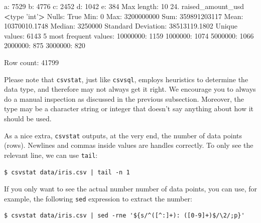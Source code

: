 \documentclass[
]{book}
\newenvironment{Shaded}{\begin{snugshade}}{\end{snugshade}}
\newcommand{\BuiltInTok}[1]{#1}
\newcommand{\ExtensionTok}[1]{#1}
\newcommand{\NormalTok}[1]{#1}
\newcommand{\OperatorTok}[1]{\textcolor[rgb]{0.81,0.36,0.00}{\textbf{#1}}}
\newcommand{\StringTok}[1]{\textcolor[rgb]{0.31,0.60,0.02}{#1}}
\theoremstyle{definition}
\theoremstyle{definition}
\theoremstyle{definition}
\theoremstyle{remark}
\begin{document}
\begin{Shaded}
\begin{Highlighting}[]
                \ExtensionTok{a}\NormalTok{:      7529}
                \ExtensionTok{b}\NormalTok{:      4776}
                \ExtensionTok{c}\NormalTok{:      2452}
                \ExtensionTok{d}\NormalTok{:      1042}
                \ExtensionTok{e}\NormalTok{:      384}
        \ExtensionTok{Max}\NormalTok{ length: 10}
 \ExtensionTok{24.}\NormalTok{ raised_amount_usd}
        \OperatorTok{<}\BuiltInTok{type} \StringTok{'int'}\OperatorTok{>}
        \ExtensionTok{Nulls}\NormalTok{: True}
        \ExtensionTok{Min}\NormalTok{: 0}
        \ExtensionTok{Max}\NormalTok{: 3200000000}
        \ExtensionTok{Sum}\NormalTok{: 359891203117}
        \ExtensionTok{Mean}\NormalTok{: 10370010.1748}
        \ExtensionTok{Median}\NormalTok{: 3250000}
        \ExtensionTok{Standard}\NormalTok{ Deviation: 38513119.1802}
        \ExtensionTok{Unique}\NormalTok{ values: 6143}
        \ExtensionTok{5}\NormalTok{ most frequent values:}
                \ExtensionTok{10000000}\NormalTok{:       1159}
                \ExtensionTok{1000000}\NormalTok{:        1074}
                \ExtensionTok{5000000}\NormalTok{:        1066}
                \ExtensionTok{2000000}\NormalTok{:        875}
                \ExtensionTok{3000000}\NormalTok{:        820}

\ExtensionTok{Row}\NormalTok{ count: 41799}
\end{Highlighting}
\end{Shaded}

Please note that \texttt{csvstat}, just like \texttt{csvsql}, employs heuristics to determine the data type, and therefore may not always get it right. We encourage you to always do a manual inspection as discussed in the previous subsection. Moreover, the type may be a character string or integer that doesn't say anything about how it should be used.

As a nice extra, \texttt{csvstat} outputs, at the very end, the number of data points (rows). Newlines and commas inside values are handles correctly. To only see the relevant line, we can use \texttt{tail}:

\begin{verbatim}
$ csvstat data/iris.csv | tail -n 1
\end{verbatim}

If you only want to see the actual number number of data points, you can use, for example, the following \texttt{sed} expression to extract the number:

\begin{verbatim}
$ csvstat data/iris.csv | sed -rne '${s/^([^:]+): ([0-9]+)$/\2/;p}'
\end{verbatim}
\end{document}
